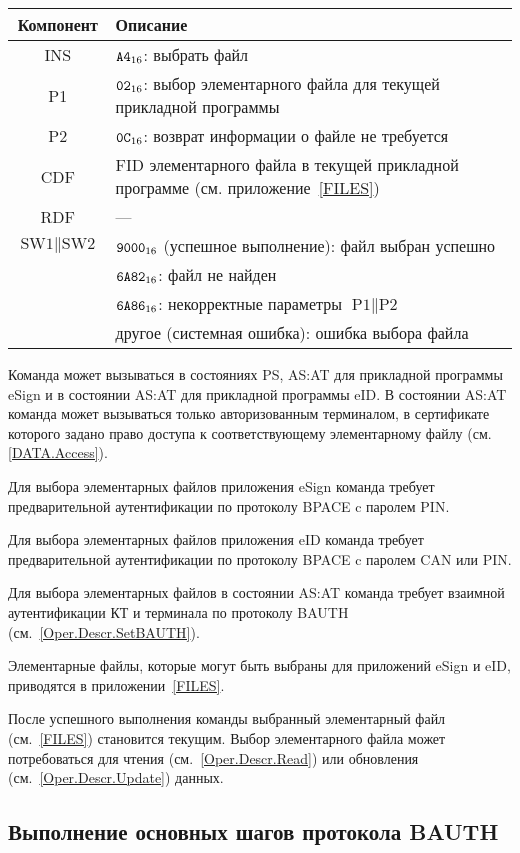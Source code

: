 \noindent
\begin{tabular}{|c|p{14cm}|}
\hline
Компонент & Описание \\
\hline
\hline
INS & $\texttt{A4}_{16}$: выбрать файл\\ 
\hline
P1 & $\texttt{02}_{16}$: выбор элементарного файла для текущей прикладной программы\\
\hline
P2 & $\texttt{0C}_{16}$: возврат информации о файле не требуется \\
\hline
CDF & FID элементарного файла в текущей прикладной программе (см. приложение~\ref{FILES})\\
\hline \hline
RDF &  --- \\
\hline
$\text{SW1}\parallel\text{SW2}$ & 
$\texttt{9000}_{16}$ (успешное выполнение): файл выбран успешно\\
 & $\texttt{6A82}_{16}$: файл не найден\\
 & $\texttt{6A86}_{16}$: некорректные параметры $\text{P1} \parallel \text{P2}$ \\
 & другое (системная ошибка): ошибка выбора файла\\
\hline
\end{tabular}

Команда может вызываться в состояниях PS, AS:AT 
для прикладной программы eSign и в состоянии 
AS:AT для прикладной программы eID.
В состоянии AS:AT команда может вызываться только 
авторизованным терминалом, в сертификате которого
задано право доступа к соответствующему элементарному файлу (см. \ref{DATA.Access}).

Для выбора элементарных файлов приложения eSign команда требует 
предварительной аутентификации по протоколу BPACE c 
паролем PIN.

Для выбора элементарных файлов приложения eID команда требует 
предварительной аутентификации по протоколу BPACE c 
паролем CAN или PIN.

Для выбора элементарных файлов в состоянии AS:AT
команда требует взаимной аутентификации КТ и терминала
по протоколу BAUTH (см.~\ref{Oper.Descr.SetBAUTH}).

Элементарные файлы, которые могут быть выбраны 
для приложений eSign и eID, приводятся в приложении~\ref{FILES}. 

После успешного выполнения команды выбранный элементарный файл
(см.~\ref{FILES}) становится текущим.
Выбор элементарного файла может потребоваться для
чтения (см.~\ref{Oper.Descr.Read}) или 
обновления (см.~\ref{Oper.Descr.Update}) данных.

\subsection{Выполнение основных шагов протокола BAUTH}
\label{Oper.Descr.GABAUTH} 

